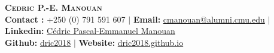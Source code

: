 \documentclass[A4,11pt]{article}
\begin{document}
\begin{center}
  \textbf{\LARGE \scshape Cedric P.-E. Manouan} \\ \vspace{1pt} %
  \textbf{Contact :} \small{+250 (0) 791 591 607} $|$
  \textbf{Email:} \href{mailto:cmanouan@alumni.cmu.edu}{cmanouan@alumni.cmu.edu} $|$
  \textbf{Linkedin:} \href{https://www.linkedin.com/in/cpem/}{Cédric Pascal-Emmanuel Manouan} \\
  \textbf{Github:} \href{https://github.com/dric2018/}{dric2018} $|$
  \textbf{Website:} \href{https://dric2018.github.io}{dric2018.github.io}

\end{center}




\begin{comment}
try to briefly explain what you did and why it is relevant to the position you
are seeking
\end{comment}
\end{document}
